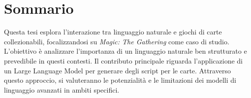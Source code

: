 \chapter*{Sommario} %

Questa tesi esplora l'interazione tra linguaggio naturale e giochi di carte collezionabili, focalizzandosi su \emph{Magic: The Gathering} come caso di studio. L'obiettivo è analizzare l'importanza di un linguaggio naturale ben strutturato e prevedibile in questi contesti. Il contributo principale riguarda l'applicazione di un Large Language Model per generare degli script per le carte. Attraverso questo approccio, si valuteranno le potenzialità e le limitazioni dei modelli di linguaggio avanzati in ambiti specifici.
